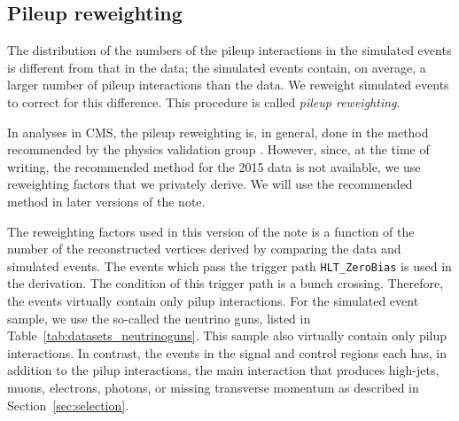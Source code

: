 \begin{landscape}
\begin{table}[!h]
\tiny 
\label{tab:datasets_bkg}
\end{table}
\end{landscape}

\subsection{Pileup reweighting}


The distribution of the numbers of the pileup interactions in the
simulated events is different from that in the data; the simulated
events contain, on average, a larger number of pileup interactions than
the data. We reweight simulated events to correct for this difference.
This procedure is called \textit{pileup reweighting}.

In analyses in CMS, the pileup reweighting is, in general, done in the
method recommended by the physics validation group
\cite{twiki-PdmVPileUpDescription}. However, since, at the time of
writing, the recommended method for the 2015 data is not available, we
use reweighting factors that we privately derive. We will use the
recommended method in later versions of the note.

The reweighting factors used in this version of the note is a function
of the number of the reconstructed vertices derived by comparing the
data and simulated events. The events which pass the trigger path
\verb!HLT_ZeroBias! is used in the derivation. The condition of this
trigger path is a bunch crossing. Therefore, the events virtually
contain only pilup interactions. For the simulated event sample, we use
the so-called the neutrino guns, listed in
Table~\ref{tab:datasets_neutrinoguns}. This sample also virtually
contain only pilup interactions. In contrast, the events in the signal
and control regions each has, in addition to the pilup interactions, the
main interaction that produces high-\PT jets, muons, electrons, photons,
or missing transverse momentum as described in
Section~\ref{sec:selection}.


\begin{table}[!h]
\footnotesize 
\label{tab:datasets_neutrinoguns}
\end{table}

